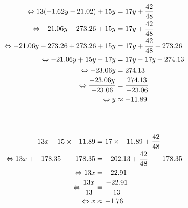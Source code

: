 \documentclass{article}%
\begin{document}
\\%
\ \\%
\vspace{5mm}%
\newline%
\begin{align*}%
\ \Leftrightarrow  13(-1.62y - 21.02) + 15y &= 17y + \frac{42}{48} \\%
\vspace{5mm}%
\newline%
\ \Leftrightarrow  -21.06y - 273.26 + 15y &= 17y + \frac{42}{48} \\%
\vspace{5mm}%
\newline%
\ \Leftrightarrow  -21.06y - 273.26 +273.26 + 15y &= 17y + \frac{42}{48} +273.26 \\%
\vspace{5mm}%
\newline%
\ \Leftrightarrow  -21.06y +15y - 17y &= 17y -17y + 274.13 \\%
\vspace{5mm}%
\newline%
\ \Leftrightarrow  -23.06y &= 274.13 \\%
\vspace{5mm}%
\newline%
\ \Leftrightarrow  \frac{-23.06y}{-23.06} &= \frac{274.13}{-23.06} \\%
\vspace{5mm}%
\newline%
\ \Leftrightarrow y &\approx -11.89 \\%
\vspace{5mm}%
\newline%
\end{align*}%
\ \\%
\vspace{5mm}%
\newline%
\begin{align*}%
\  13x + 15 \times -11.89 &= 17 \times -11.89 + \frac{42}{48} \\%
\vspace{5mm}%
\newline%
\ \Leftrightarrow 13x + -178.35 - -178.35 &= -202.13 +\frac{42}{48} --178.35 \\%
\vspace{5mm}%
\newline%
\ \Leftrightarrow 13x &= -22.91 \\%
\vspace{5mm}%
\newline%
\ \Leftrightarrow \frac{13x}{13} &= \frac{-22.91}{13} \\%
\vspace{5mm}%
\newline%
\ \Leftrightarrow x &\approx -1.76 \\%
\vspace{5mm}%
\newline%
\end{align*}%
\end{document}
